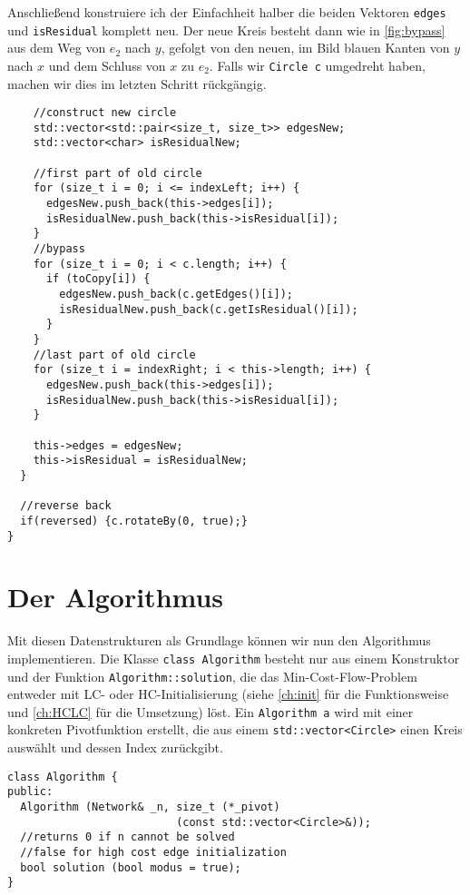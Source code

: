Anschließend konstruiere ich der Einfachheit halber die beiden Vektoren \lstinline|edges| und \lstinline|isResidual| komplett neu. Der neue Kreis besteht dann wie in \cref{fig:bypass} aus dem Weg von $e_2$ nach $y$, gefolgt von den neuen, im Bild blauen Kanten von $y$ nach $x$ und dem Schluss von $x$ zu $e_2$. Falls wir \lstinline|Circle c| umgedreht haben, machen wir dies im letzten Schritt rückgängig.
    
\begin{lstlisting}
    //construct new circle
    std::vector<std::pair<size_t, size_t>> edgesNew;
    std::vector<char> isResidualNew;
    
    //first part of old circle
    for (size_t i = 0; i <= indexLeft; i++) {
      edgesNew.push_back(this->edges[i]);
      isResidualNew.push_back(this->isResidual[i]);
    }
    //bypass
    for (size_t i = 0; i < c.length; i++) {
      if (toCopy[i]) {
        edgesNew.push_back(c.getEdges()[i]);
        isResidualNew.push_back(c.getIsResidual()[i]);
      }
    }
    //last part of old circle
    for (size_t i = indexRight; i < this->length; i++) {
      edgesNew.push_back(this->edges[i]);
      isResidualNew.push_back(this->isResidual[i]);
    }
    
    this->edges = edgesNew;
    this->isResidual = isResidualNew;
  }

  //reverse back
  if(reversed) {c.rotateBy(0, true);}
}
\end{lstlisting}

\section{Der Algorithmus}
Mit diesen Datenstrukturen als Grundlage können wir nun den Algorithmus implementieren. Die Klasse \lstinline|class Algorithm| besteht nur aus einem Konstruktor und der Funktion \lstinline|Algorithm::solution|, die das Min-Cost-Flow-Problem entweder mit LC- oder HC-Initialisierung (siehe \cref{ch:init} für die Funktionsweise und \cref{ch:HCLC} für die Umsetzung) löst. Ein \lstinline|Algorithm a| wird mit einer konkreten Pivotfunktion erstellt, die aus einem \lstinline|std::vector<Circle>| einen Kreis auswählt und dessen Index zurückgibt.
\begin{lstlisting}
class Algorithm {
public:
  Algorithm (Network& _n, size_t (*_pivot)
                          (const std::vector<Circle>&));
  //returns 0 if n cannot be solved
  //false for high cost edge initialization
  bool solution (bool modus = true);
}
\end{lstlisting}

